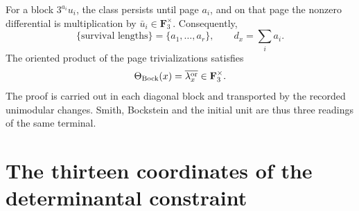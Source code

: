 For a block \(3^{a_i}u_i\), the class persists until page \(a_i\),
and on that page the nonzero differential is multiplication by
\(\bar u_i\in\mathbf F_3^\times\). Consequently,
\begin{equation}\label{eq:detint-bock-longitudes}
 \{\text{survival lengths}\}=\{a_1,\ldots,a_r\},
 \qquad
 d_x=\sum_i a_i.
\end{equation}
The oriented product of the page trivializations satisfies
\begin{equation}\label{eq:detint-bock-leading}
 \Theta_{\rm Bock}(x)=\overline{\lambda_x^{\rm or}}
 \in\mathbf F_3^\times.
\end{equation}
The proof is carried out in each diagonal block and transported by the recorded
unimodular changes. Smith, Bockstein and the initial unit are thus three
readings of the same terminal.

\section{The thirteen coordinates of the determinantal constraint}

